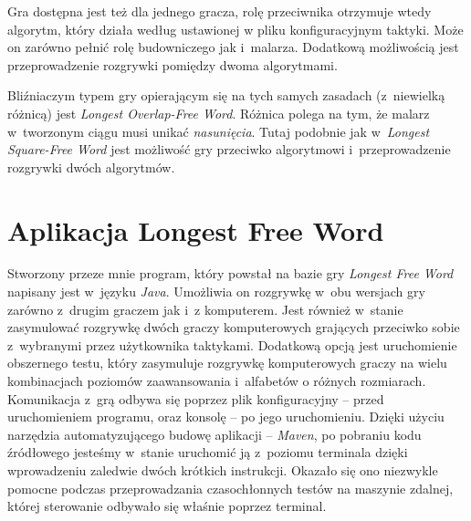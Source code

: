 \documentclass[document]{xmgr}
\begin{document}
Gra dostępna jest też dla jednego gracza, rolę przeciwnika otrzymuje wtedy algorytm, który działa według ustawionej w pliku konfiguracyjnym taktyki. Może on zarówno pełnić rolę budowniczego jak i~malarza. Dodatkową możliwością jest przeprowadzenie rozgrywki pomiędzy dwoma algorytmami.

Bliźniaczym typem gry opierającym się na tych samych zasadach (z~niewielką różnicą) jest \emph{Longest Overlap-Free Word}. Różnica polega na tym, że malarz w~tworzonym ciągu musi unikać \emph{nasunięcia}. Tutaj podobnie jak w~\emph{Longest Square-Free Word} jest możliwość gry przeciwko algorytmowi i~przeprowadzenie rozgrywki dwóch algorytmów.

\chapter{Aplikacja Longest Free Word}
Stworzony przeze mnie program, który powstał na bazie gry \emph{Longest Free Word} napisany jest w~języku \emph{Java}. Umożliwia on rozgrywkę w~obu wersjach gry zarówno z~drugim graczem jak i~z komputerem. Jest również w~stanie zasymulować rozgrywkę dwóch graczy komputerowych grających przeciwko sobie z~wybranymi przez użytkownika taktykami. Dodatkową opcją jest uruchomienie obszernego testu, który zasymuluje rozgrywkę komputerowych graczy na wielu kombinacjach poziomów zaawansowania i~alfabetów o różnych rozmiarach. Komunikacja z~grą odbywa się poprzez plik konfiguracyjny -- przed uruchomieniem programu, oraz konsolę -- po jego uruchomieniu. Dzięki użyciu narzędzia automatyzującego budowę aplikacji -- \emph{Maven}, po pobraniu kodu źródłowego jesteśmy w~stanie uruchomić ją z~poziomu terminala dzięki wprowadzeniu zaledwie dwóch krótkich instrukcji. Okazało się ono niezwykle pomocne podczas przeprowadzania czasochłonnych testów na maszynie zdalnej, której sterowanie odbywało się właśnie poprzez terminal.
\end{document}
